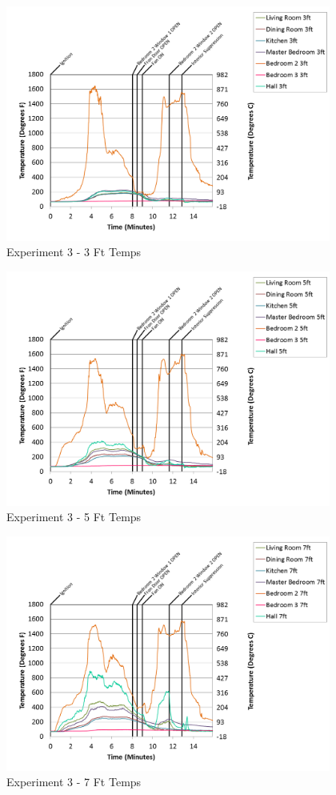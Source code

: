 \documentclass{article}
\begin{document}
\begin{appendices}
\begin{figure}[h!]
	\centering
	\includegraphics[height=3.05in]{0_Images/Results_Charts/Exp_3_Charts/3FtTemps.png}
	\caption{Experiment 3 - 3 Ft Temps}
\end{figure}

\clearpage

\begin{figure}[h!]
	\centering
	\includegraphics[height=3.05in]{0_Images/Results_Charts/Exp_3_Charts/5FtTemps.png}
	\caption{Experiment 3 - 5 Ft Temps}
\end{figure}


\begin{figure}[h!]
	\centering
	\includegraphics[height=3.05in]{0_Images/Results_Charts/Exp_3_Charts/7FtTemps.png}
	\caption{Experiment 3 - 7 Ft Temps}
\end{figure}


\end{appendices}
\end{document}
